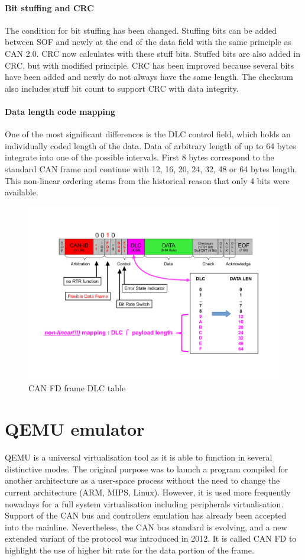 \documentclass{ctuthesis}
\begin{document}
   \subsubsection{Bit stuffing and CRC}
    The condition for bit stuffing has been changed. Stuffing bits can be added between SOF and newly at the end of the data field with the same principle as CAN 2.0. CRC now calculates with these stuff bits. Stuffed bits are also added in CRC, but with modified principle. CRC has been improved because several bits have been added and newly do not always have the same length. The checksum also includes stuff bit count to support CRC with data integrity.
   \subsubsection{Data length code mapping}
    One of the most significant differences is the DLC control field, which holds an individually coded length of the data. Data of arbitrary length of up to 64 bytes integrate into one of the possible intervals. First 8 bytes correspond to the standard CAN frame and continue with 12, 16, 20, 24, 32, 48 or 64 bytes length. This non-linear ordering stems from the historical reason that only 4 bits were available.
    \begin{figure}[H]
    \includegraphics[width=1\textwidth]{agl2017-socketcan-can_fd_dlc}
    \caption{CAN FD frame DLC table \cite{canfd_dlc}}
    \end{figure}
 
\chapter{QEMU emulator}
 QEMU is a universal virtualisation tool as it is able to function in several distinctive modes. The original purpose was to launch a program compiled for another architecture as a user-space process without the need to change the current architecture (ARM, MIPS, Linux). However, it is used more frequently nowadays for a full system virtualisation including peripherals virtualisation. Support of the CAN bus and controllers emulation has already been accepted into the mainline. Nevertheless, the CAN bus standard  is evolving, and a new extended variant of the protocol was introduced in 2012. It is called CAN FD to highlight the use of higher bit rate for the data portion of the frame.
\end{document}
